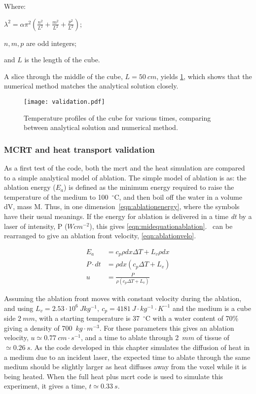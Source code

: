 \noindent Where:

	\indent $\lambda^2=\alpha\pi^2(\tfrac{n^2}{L^2}+\tfrac{m^2}{L^2}+\tfrac{p^2}{L^2})$;
	
	\indent $n,m,p$ are odd integers;
	
	\indent and $L$ is the length of the cube.
	
	\medskip
	
A slice through the middle of the cube, $L=50~cm$,  yields \cref{fig:validation-heat}, which shows that the numerical method matches the analytical solution closely.

\begin{figure}[!htbp]
	\centering
	\texttt{[image: validation.pdf]}
	\caption{Temperature profiles of the cube for various times, comparing between analytical solution and numerical method.}
	\label{fig:validation-heat}
\end{figure}	

\subsubsection*{MCRT and heat transport validation}


As a first test of the code, both the \gls*{mcrt} and the heat simulation are compared to a simple analytical model of ablation. The simple model of ablation is as: the ablation energy ($E_a$) is defined as the minimum energy required to raise the temperature of the medium to 100~$^{\circ}$C, and then boil off the water in a volume dV, mass M. Thus, in one dimension~\cref{eqn:ablationenergy}, where the symbols have their usual meanings. If the energy for ablation is delivered in a time \textit{dt} by a laser of intensity, P ($Wcm^{-2}$), this gives \cref{eqn:midequationablation}.~ can be rearranged to give an ablation front velocity, \cref{eqn:ablationvelo}.


\begin{align}
E_a &= c_p \rho dx \Delta T + L_v \rho dx \label{eqn:ablationenergy}\\
P\cdot dt &= \rho dx (c_p \Delta T + L_v) \label{eqn:midequationablation} \\
u &= \frac{P}{\rho(c_p\Delta T+ L_v)} \label{eqn:ablationvelo}
\end{align}

Assuming the ablation front moves with constant velocity during the ablation, and using $L_v=2.53\cdot 10^6\ J kg^{-1},\ c_p=4181\ J\cdot kg^{-1}\cdot K^{-1}$ and the medium is a cube side $2\ mm$, with a starting temperature is 37~$^{\circ}$C with a water content of 70\% giving a density of 700~$kg\cdot m^{-3}$. For these parameters this gives an ablation velocity, $u\simeq 0.77\ cm\cdot s^{-1}$, and a time to ablate through 2~$mm$ of tissue of $\simeq 0.26~s$.
As the code developed in this chapter simulates the diffusion of heat in a medium due to an incident laser, the expected time to ablate through the same medium should be slightly larger as heat diffuses away from the voxel while it is being heated. When the full heat plus \gls*{mcrt} code is used to simulate this experiment, it gives a time, $t \simeq 0.33~s$.	

